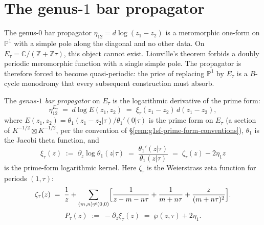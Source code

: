 
\section{The genus-$1$ bar propagator}
\label{sec:g1sf-propagator}

The genus-$0$ bar propagator $\eta_{12} = d\log(z_1 - z_2)$ is a
meromorphic one-form on $\mathbb{P}^1$ with a simple pole along the
diagonal and no other data. On
$E_\tau = \mathbb{C}/(\mathbb{Z} + \mathbb{Z}\tau)$, this object
cannot exist. Liouville's theorem forbids a doubly periodic
meromorphic function with a single simple pole. The propagator is
therefore forced to become quasi-periodic: the price of replacing
$\mathbb{P}^1$ by $E_\tau$ is a $B$-cycle monodromy that every
subsequent construction must absorb.

\begin{definition}
\label{def:g1sf-bar-propagator}
The \emph{genus-$1$ bar propagator} on $E_\tau$ is the logarithmic
derivative of the prime form:
\begin{equation}\label{eq:g1sf-propagator}
\eta_{12}^{E_\tau}
\;=\;
d\log E(z_1, z_2)
\;=\;
\xi_\tau(z_1 - z_2)\, d(z_1 - z_2),
\end{equation}
where $E(z_1,z_2) = \theta_1(z_1 - z_2 | \tau)/\theta_1'(0|\tau)$
is the prime form on $E_\tau$
(a section of $K^{-1/2} \boxtimes K^{-1/2}$, per the convention of
\S\ref{rem:g1sf-prime-form-conventions}), $\theta_1$ is the Jacobi
theta function, and
\begin{equation}\label{eq:g1sf-xi-kernel}
\xi_\tau(z)
\;:=\;
\partial_z\log\theta_1(z|\tau)
\;=\;
\frac{\theta_1'(z|\tau)}{\theta_1(z|\tau)}
\;=\;
\zeta_\tau(z)-2\eta_1 z
\end{equation}
is the prime-form logarithmic kernel. Here $\zeta_\tau$ is the
Weierstrass zeta function for periods $(1,\tau)$:
\begin{equation}\label{eq:g1sf-weierstrass-zeta}
\zeta_\tau(z)
\;=\;
\frac{1}{z}
+ \sum_{(m,n) \neq (0,0)}
\Bigl[
 \frac{1}{z - m - n\tau}
 + \frac{1}{m + n\tau}
 + \frac{z}{(m + n\tau)^2}
\Bigr].
\end{equation}
\begin{equation}\label{eq:g1sf-P-kernel}
P_\tau(z)
\;:=\;
-\partial_z\xi_\tau(z)
\;=\;
\wp(z,\tau)+2\eta_1 .
\end{equation}
\end{definition}

